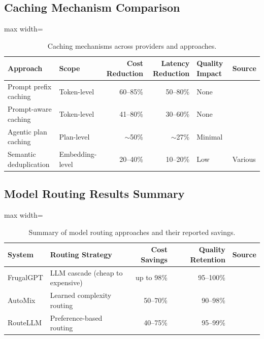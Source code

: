 \documentclass[11pt, a4paper, copyright]{googledeepmind}
\begin{document}
\begin{appendices}
\subsection{Caching Mechanism Comparison}

\begin{table}[H]
\centering
\caption{Caching mechanisms across providers and approaches.}
\label{tab:caching-comparison}
\begin{adjustbox}{max width=\textwidth}
\begin{tabular}{llrrll}
\toprule
\textbf{Approach} & \textbf{Scope} & \textbf{Cost Reduction} & \textbf{Latency Reduction} & \textbf{Quality Impact} & \textbf{Source} \\
\midrule
Prompt prefix caching & Token-level & 60--85\% & 50--80\% & None & \citet{anthropic2026coding} \\
Prompt-aware caching & Token-level & 41--80\% & 30--60\% & None & \citet{liang2026cache} \\
Agentic plan caching & Plan-level & $\sim$50\% & $\sim$27\% & Minimal & \citet{zhang2025plancache} \\
Semantic deduplication & Embedding-level & 20--40\% & 10--20\% & Low & Various \\
\bottomrule
\end{tabular}
\end{adjustbox}
\end{table}

\subsection{Model Routing Results Summary}

\begin{table}[H]
\centering
\caption{Summary of model routing approaches and their reported savings.}
\label{tab:routing-summary}
\begin{adjustbox}{max width=\textwidth}
\begin{tabular}{llrrl}
\toprule
\textbf{System} & \textbf{Routing Strategy} & \textbf{Cost Savings} & \textbf{Quality Retention} & \textbf{Source} \\
\midrule
FrugalGPT & LLM cascade (cheap to expensive) & up to 98\% & 95--100\% & \citet{chen2023frugalgpt} \\
AutoMix & Learned complexity routing & 50--70\% & 90--98\% & \citet{madaan2024automix} \\
RouteLLM & Preference-based routing & 40--75\% & 95--99\% & \citet{ong2024routellm} \\
\bottomrule
\end{tabular}
\end{adjustbox}
\end{table}

\end{appendices}


\end{document}
